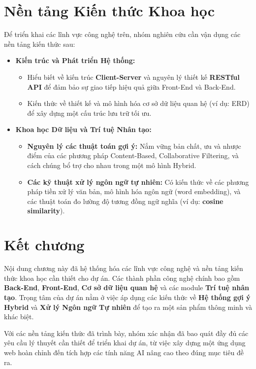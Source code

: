 \section{Nền tảng Kiến thức Khoa học}

Để triển khai các lĩnh vực công nghệ trên, nhóm nghiên cứu cần vận dụng các nền tảng kiến thức sau:

\begin{itemize}
    \item \textbf{Kiến trúc và Phát triển Hệ thống:}
    \begin{itemize}
        \item Hiểu biết về kiến trúc \textbf{Client-Server} và nguyên lý thiết kế \textbf{RESTful API} để đảm bảo sự giao tiếp hiệu quả giữa Front-End và Back-End.
        \item Kiến thức về thiết kế và mô hình hóa cơ sở dữ liệu quan hệ (ví dụ: ERD) để xây dựng một cấu trúc lưu trữ tối ưu.
    \end{itemize}
    
    \item \textbf{Khoa học Dữ liệu và Trí tuệ Nhân tạo:}
    \begin{itemize}
        \item \textbf{Nguyên lý các thuật toán gợi ý:} Nắm vững bản chất, ưu và nhược điểm của các phương pháp Content-Based, Collaborative Filtering, và cách chúng bổ trợ cho nhau trong một mô hình Hybrid.
        \item \textbf{Các kỹ thuật xử lý ngôn ngữ tự nhiên:} Có kiến thức về các phương pháp tiền xử lý văn bản, mô hình hóa ngôn ngữ (word embedding), và các thuật toán đo lường độ tương đồng ngữ nghĩa (ví dụ: \textbf{cosine similarity}).
    \end{itemize}
\end{itemize}

\section{Kết chương}

Nội dung chương này đã hệ thống hóa các lĩnh vực công nghệ và nền tảng kiến thức khoa học cần thiết cho dự án. Các thành phần công nghệ chính bao gồm \textbf{Back-End}, \textbf{Front-End}, \textbf{Cơ sở dữ liệu quan hệ} và các module \textbf{Trí tuệ nhân tạo}. Trọng tâm của dự án nằm ở việc áp dụng các kiến thức về \textbf{Hệ thống gợi ý Hybrid} và \textbf{Xử lý Ngôn ngữ Tự nhiên} để tạo ra một sản phẩm thông minh và khác biệt.

Với các nền tảng kiến thức đã trình bày, nhóm xác nhận đã bao quát đầy đủ các yêu cầu lý thuyết cần thiết để triển khai dự án, từ việc xây dựng một ứng dụng web hoàn chỉnh đến tích hợp các tính năng AI nâng cao theo đúng mục tiêu đề ra.
